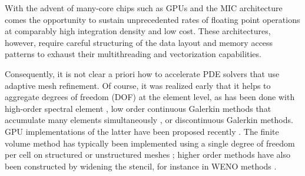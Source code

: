 \documentclass{IOS-Book-Article}     %
\newcommand{\comment}[1]{\textcolor{green}{[DAC: #1]}\xspace}
\newcommand{\todo}[1]{\textcolor{red}{[TODO: #1]}\xspace}
\begin{document}
With the advent of many-core chips such as GPUs and the MIC architecture
 comes the opportunity to sustain unprecedented rates of floating point
operations at comparably high integration density and low cost.  These
architectures, however, require careful structuring of the data layout and
memory access patterns to exhaust their multithreading and vectorization
capabilities.

Consequently, it is not clear a priori how to accelerate PDE solvers
that use adaptive mesh refinement.
Of course, it was realized early that it helps to aggregate degrees of
freedom (DOF) at the element level, as has been done with high-order
spectral element \cite{TufoFischer99}, low order continuous Galerkin methods that accumulate many elements simultaneously \cite{knepleyterrel:2013},
or discontinuous Galerkin \cite{HesthavenWarburton02}
methods.  GPU implementations of the latter have been proposed recently
\cite{KlocknerWarburtonBridgeEtAl09, BursteddeGhattasGurnisEtAl10}.
The finite volume method has typically been implemented using a single degree
of freedom per cell on
structured
\cite{ppm, clawpack}
or unstructured meshes
\cite{openfoam};
higher order methods have also been constructed by widening the stencil, for instance in WENO methods
\cite{Shu:2009bi}.

\end{document}
